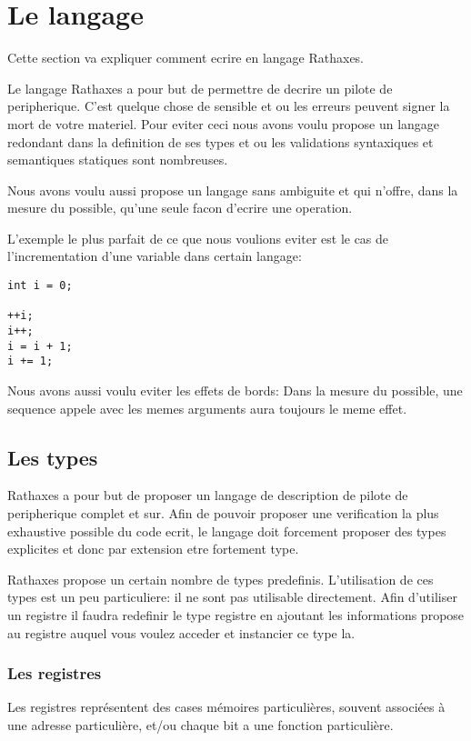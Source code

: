 \documentclass{rtxreport}
\begin{document}
\chapter{Le langage}

Cette section va expliquer comment ecrire en langage Rathaxes.

Le langage Rathaxes a pour but de permettre de decrire un pilote de peripherique.
C'est quelque chose de sensible et ou les erreurs peuvent signer la mort de votre materiel.
Pour eviter ceci nous avons voulu propose un langage redondant dans la definition de ses types
et ou les validations syntaxiques et semantiques statiques sont nombreuses.

Nous avons voulu aussi propose un langage sans ambiguite et qui n'offre, dans la mesure du possible,
qu'une seule facon d'ecrire une operation.

L'exemple le plus parfait de ce que nous voulions eviter est le cas de l'incrementation d'une variable dans certain
langage:

\lstset{language=C++}
\begin{lstlisting}
int i = 0;

++i;
i++;
i = i + 1;
i += 1;
\end{lstlisting}

\lstset{language=rathaxes}

Nous avons aussi voulu eviter les effets de bords:
Dans la mesure du possible, une sequence appele avec les memes arguments aura toujours le meme effet.

\section{Les types}
Rathaxes a pour but de proposer un langage de description de pilote de peripherique complet et sur.
Afin de pouvoir proposer une verification la plus exhaustive possible du code ecrit, le langage doit
forcement proposer des types explicites et donc par extension etre fortement type.

Rathaxes propose un certain nombre de types predefinis. L'utilisation de ces types est
un peu particuliere: il ne sont pas utilisable directement. Afin d'utiliser un registre il faudra
redefinir le type registre en ajoutant les informations propose au registre auquel vous voulez acceder
et instancier ce type la.

\subsection{Les registres}
Les registres représentent des cases mémoires particulières, souvent associées
à une adresse particulière, et/ou chaque bit a une fonction particulière.
\end{document}
